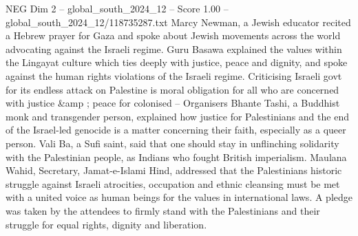 \begin{textsample}{NEG Dim 2 – global\_south\_2024\_12 – Score 1.00 – global\_south\_2024\_12/118735287.txt}
Marcy Newman, a Jewish educator recited a Hebrew prayer for Gaza and spoke about Jewish movements across the world advocating against the Israeli regime.
Guru Basawa explained the values within the Lingayat culture which ties deeply with justice, peace and dignity, and spoke against the human rights violations of the Israeli regime.
Criticising Israeli govt for its endless attack on Palestine is moral obligation for all who are concerned with justice \&amp ; peace for colonised -- Organisers Bhante Tashi, a Buddhist monk and transgender person, explained how justice for Palestinians and the end of the Israel-led genocide is a matter concerning their faith, especially as a queer person.
Vali Ba, a Sufi saint, said that one should stay in unflinching solidarity with the Palestinian people, as Indians who fought British imperialism.
Maulana Wahid, Secretary, Jamat-e-Islami Hind, addressed that the Palestinians historic struggle against Israeli atrocities, occupation and ethnic cleansing must be met with a united voice as human beings for the values in international laws.
A pledge was taken by the attendees to firmly stand with the Palestinians and their struggle for equal rights, dignity and liberation.

\end{textsample}
